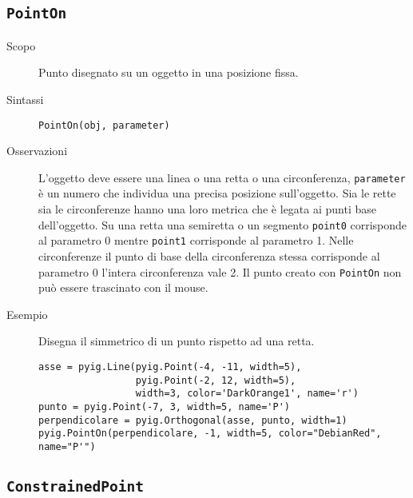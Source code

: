 \subsection{\lstinline{PointOn}}
\label{sub:geoint_pointon}

\begin{description}
 \item [Scopo] Punto disegnato su un oggetto in una posizione fissa.
 \item [Sintassi] \lstinline{PointOn(obj, parameter)}
 \item [Osservazioni]
L'oggetto deve essere una linea o una retta o una circonferenza,
\lstinline{parameter} è un numero che individua una precisa posizione 
sull'oggetto.
Sia le rette sia le circonferenze hanno una loro metrica che è legata ai punti
base dell'oggetto. Su una retta una semiretta o un segmento \lstinline{point0}
corrisponde al parametro 0 mentre \lstinline{point1} corrisponde al parametro 1.
Nelle circonferenze il punto di base della circonferenza stessa corrisponde
al parametro 0 l'intera circonferenza vale 2.
Il punto creato con \lstinline{PointOn} non può essere trascinato con il mouse.

 \item [Esempio] Disegna il simmetrico di un punto rispetto ad una retta.

\begin{lstlisting}
asse = pyig.Line(pyig.Point(-4, -11, width=5), 
                 pyig.Point(-2, 12, width=5), 
                 width=3, color='DarkOrange1', name='r')
punto = pyig.Point(-7, 3, width=5, name='P')
perpendicolare = pyig.Orthogonal(asse, punto, width=1)
pyig.PointOn(perpendicolare, -1, width=5, color="DebianRed", name="P'")
\end{lstlisting}

\end{description}

\subsection{\lstinline{ConstrainedPoint}}
\label{sub:geoint_constrainedpoint}

